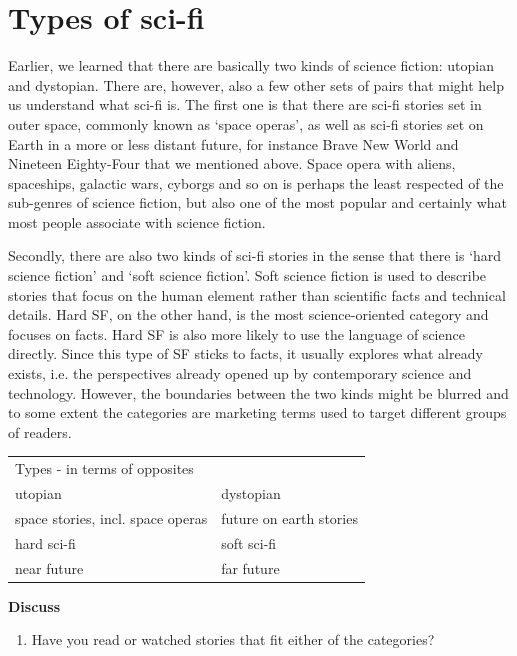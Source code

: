 \documentclass[11pt,a4paper,oneside]{book}
\newcommand{\tasktitle}[1]{{\color{blue}\bfseries #1}\par\smallskip}
\begin{document}
\section*{Types of sci-fi}
Earlier, we learned that there are basically two kinds of science fiction: utopian and dystopian. There are, however, also a few other sets of pairs that might help us understand what sci-fi is. The first one is that there are sci-fi stories set in outer space, commonly known as ‘space operas’, as well as sci-fi stories set on Earth in a more or less distant future, for instance Brave New World and Nineteen Eighty-Four that we mentioned above. Space opera with aliens, spaceships, galactic wars, cyborgs and so on is perhaps the least respected of the sub-genres of science fiction, but also one of the most popular and certainly what most people associate with science fiction.

Secondly, there are also two kinds of sci-fi stories in the sense that there is ‘hard science fiction’ and ‘soft science fiction’. Soft science fiction is used to describe stories that focus on the human element rather than scientific facts and technical details. Hard SF, on the other hand, is the most science-oriented category and focuses on facts. Hard SF is also more likely to use the language of science directly. Since this type of SF sticks to facts, it usually explores what already exists, i.e. the perspectives already opened up by contemporary science and technology. However, the boundaries between the two kinds might be blurred and to some extent the categories are marketing terms used to target different groups of readers.


\begin{tabularx}{\linewidth}{@{}XX@{}}\toprule
Types - in terms of opposites & \\
utopian & dystopian\\
space stories, incl. space operas & future on earth stories\\
hard sci-fi & soft sci-fi\\
near future & far future\\
\bottomrule\end{tabularx}\par\medskip
\begin{taskbox}
\tasktitle{Discuss}
\begin{enumerate}
\item Have you read or watched stories that fit either of the categories?
\end{enumerate}
\end{taskbox}
\end{document}
